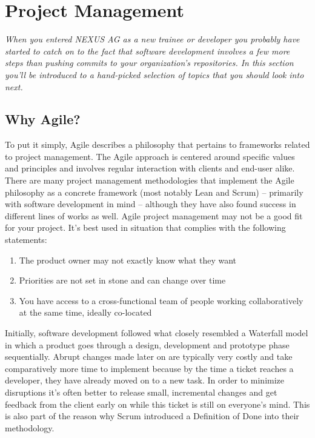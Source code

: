 \section{Project Management}\label{project-management}

\begin{flushleft}
	\emph{When you entered NEXUS AG as a new trainee or developer you probably
		have started to catch on to the fact that software development involves
		a few more steps than pushing commits to your organization's repositories.
		In this section you'll be introduced to a hand-picked selection of topics
		that you should look into next.}
\end{flushleft}

\subsection{Why Agile?}\label{agile-why-agile}

\begin{flushleft}
	To put it simply, Agile describes a philosophy that pertains to frameworks
	related to project management. The Agile approach is centered around specific
	values and principles and involves regular interaction with clients and end-user
	alike. There are many project management methodologies that implement the Agile
	philosophy as a concrete framework (most notably Lean and Scrum) -- primarily
	with software development in mind -- although they have also found success in
	different lines of works as well. Agile project management may not be a good
	fit for your project. It's best used in situation that complies with the following
	statements:
\end{flushleft}

\begin{enumerate}
	\item The product owner may not exactly know what they want
	\item Priorities are not set in stone and can change over time
	\item You have access to a cross-functional team of people working collaboratively
	      at the same time, ideally co-located
\end{enumerate}

\begin{flushleft}
	Initially, software development followed what closely resembled a Waterfall model
	in which a product goes through a design, development and prototype phase sequentially.
	Abrupt changes made later on are typically very costly and take comparatively
	more time to implement because by the time a ticket reaches a developer, they
	have already moved on to a new task. In order to minimize disruptions it's often
	better to release small, incremental changes and get feedback from the client
	early on while this ticket is still on everyone's mind. This is also part of
	the reason why Scrum introduced a Definition of Done into their methodology.
\end{flushleft}

